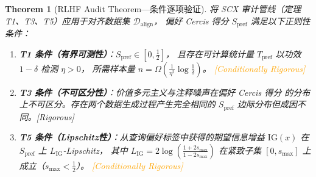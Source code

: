 \documentclass[12pt,a4paper]{article}
\newtheorem{theorem}{Theorem}[section]
\newcommand{\rigorous}{\textcolor{green!50!black}{\small\textsf{[Rigorous]}}}
\newcommand{\conditionallyrigorous}{\textcolor{orange}{\small\textsf{[Conditionally Rigorous]}}}
\newcommand{\cD}{\mathcal{D}}
\begin{document}
\begin{theorem}[RLHF Audit Theorem---条件逐项验证]
\label{thm:pref-noise}
将 SCX 审计管线（定理 T1、T3、T5）应用于对齐数据集 $\cD_{\mathrm{align}}$，
偏好 Cercis 得分 $S_{\mathrm{pref}}$ 满足以下正则性条件：
\begin{enumerate}[label=(\roman*)]
    \item \textbf{T1 条件（有界可测性）}：$S_{\mathrm{pref}} \in [0,\frac12]$，
          且存在可计算统计量 $T_{\mathrm{pref}}$ 以功效 $1-\delta$ 检测 $\eta>0$，
          所需样本量 $n = \Omega(\frac{1}{\eta^2}\log\frac{1}{\delta})$。
          \conditionallyrigorous
    \item \textbf{T3 条件（不可区分性）}：价值多元主义与注释噪声在偏好 Cercis 得分
          的分布上不可区分。存在两个数据生成过程产生完全相同的 $S_{\mathrm{pref}}$
          边际分布但成因不同。\rigorous
    \item \textbf{T5 条件（Lipschitz性）}：从查询偏好标签中获得的期望信息增益
          $\mathrm{IG}(x)$ 在 $S_{\mathrm{pref}}$ 上 $L_{\mathrm{IG}}$-Lipschitz，
          其中 $L_{\mathrm{IG}} = 2\log(\frac{1+2s_{\max}}{1-2s_{\max}})$
          在紧致子集 $[0, s_{\max}]$ 上成立（$s_{\max} < \frac12$）。
          \conditionallyrigorous
\end{enumerate}
\end{theorem}
\end{document}
